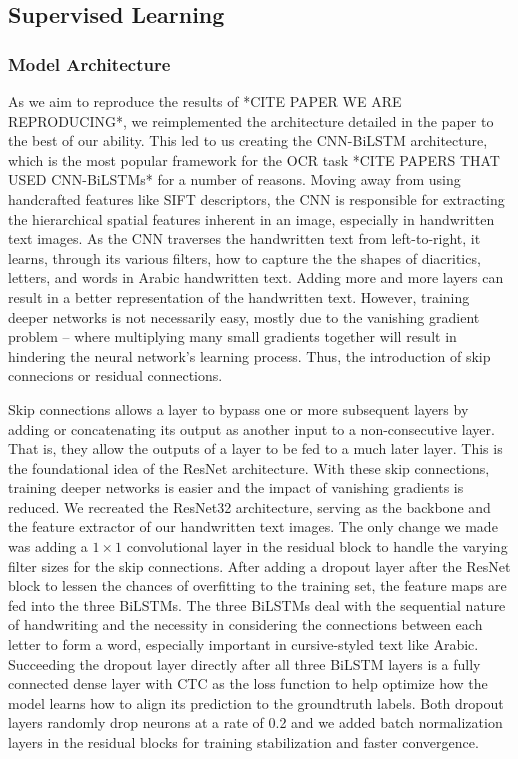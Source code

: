 \documentclass[conference]{IEEEtran}
\begin{document}
\subsection{Supervised Learning}

\subsubsection{Model Architecture}

As we aim to reproduce the results of *CITE PAPER WE ARE REPRODUCING*, we reimplemented the architecture detailed in the paper to the best of our ability. This led to us creating the CNN-BiLSTM architecture, which is the most popular framework for the OCR task *CITE PAPERS THAT USED CNN-BiLSTMs* for a number of reasons. Moving away from using handcrafted features like SIFT descriptors, the CNN is responsible for extracting the hierarchical spatial features inherent in an image, especially in handwritten text images. As the CNN traverses the handwritten text from left-to-right, it learns, through its various filters, how to capture the the shapes of diacritics, letters, and words in Arabic handwritten text. Adding more and more layers can result in a better representation of the handwritten text. However, training deeper networks is not necessarily easy, mostly due to the vanishing gradient problem -- where multiplying many small gradients together will result in hindering the neural network's learning process. Thus, the introduction of skip connecions or residual connections.

Skip connections allows a layer to bypass one or more subsequent layers by adding or concatenating its output as another input to a non-consecutive layer. That is, they allow the outputs of a layer to be fed to a much later layer. This is the foundational idea of the ResNet architecture. With these skip connections, training deeper networks is easier and the impact of vanishing gradients is reduced. We recreated the ResNet32 architecture, serving as the backbone and the feature extractor of our handwritten text images. The only change we made was adding a \( 1 \times 1 \) convolutional layer in the residual block to handle the varying filter sizes for the skip connections. After adding a dropout layer after the ResNet block to lessen the chances of overfitting to the training set, the feature maps are fed into the three BiLSTMs. The three BiLSTMs deal with the sequential nature of handwriting and the necessity in considering the connections between each letter to form a word, especially important in cursive-styled text like Arabic. Succeeding the dropout layer directly after all three BiLSTM layers is a fully connected dense layer with CTC as the loss function to help optimize how the model learns how to align its prediction to the groundtruth labels. Both dropout layers randomly drop neurons at a rate of 0.2 and we added batch normalization layers in the residual blocks for training stabilization and faster convergence.
\end{document}
